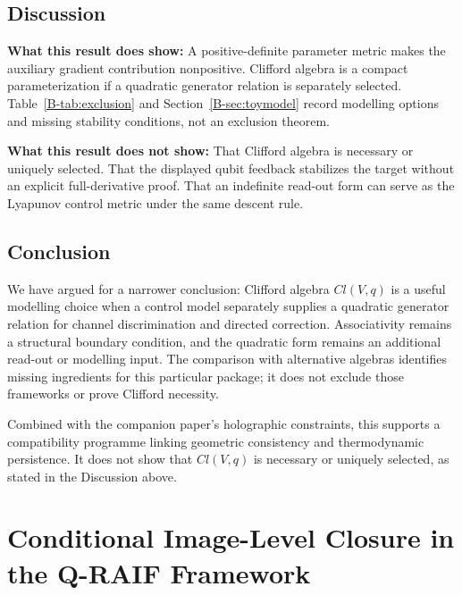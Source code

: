 \documentclass[12pt,a4paper,openany]{book}
\begin{document}
\section{Discussion}

\textbf{What this result does show:}
A positive-definite parameter metric makes the auxiliary gradient contribution nonpositive.  Clifford algebra is a compact parameterization if a quadratic generator relation is separately selected.  Table~\ref{B-tab:exclusion} and Section~\ref{B-sec:toymodel} record modelling options and missing stability conditions, not an exclusion theorem.

\textbf{What this result does not show:}
That Clifford algebra is necessary or uniquely selected.
That the displayed qubit feedback stabilizes the target without an explicit full-derivative proof.
That an indefinite read-out form can serve as the Lyapunov control metric under the same descent rule.

\section{Conclusion}

We have argued for a narrower conclusion: Clifford algebra $Cl(V,q)$ is
a useful modelling choice when a control model separately supplies a
quadratic generator relation for channel discrimination and directed
correction.  Associativity remains a structural boundary condition, and
the quadratic form remains an additional read-out or modelling input.
The comparison with alternative algebras identifies missing ingredients
for this particular package; it does not exclude those frameworks or
prove Clifford necessity.

Combined with the companion paper's holographic constraints, this
supports a compatibility programme linking geometric consistency and
thermodynamic persistence.  It does not show that $Cl(V,q)$ is necessary
or uniquely selected, as stated in the Discussion above.


\chapter{Conditional Image-Level Closure in the Q-RAIF Framework}
\label{chap:paperC}
\end{document}
